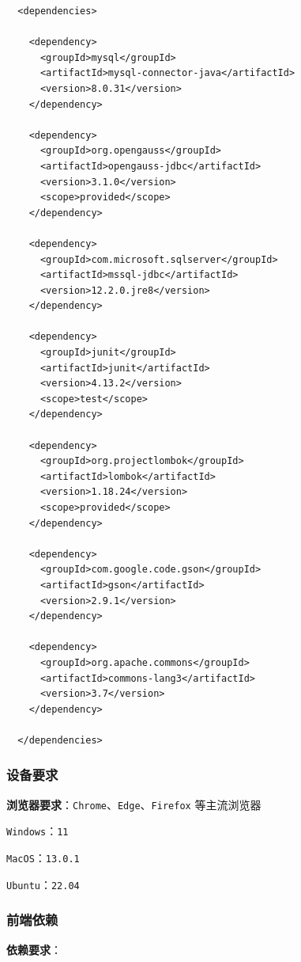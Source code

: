 \documentclass[12pt,a4paper,UTF8]{article}
\begin{document}
\begin{lstlisting}
  <dependencies>

    <dependency>
      <groupId>mysql</groupId>
      <artifactId>mysql-connector-java</artifactId>
      <version>8.0.31</version>
    </dependency>

    <dependency>
      <groupId>org.opengauss</groupId>
      <artifactId>opengauss-jdbc</artifactId>
      <version>3.1.0</version>
      <scope>provided</scope>
    </dependency>

    <dependency>
      <groupId>com.microsoft.sqlserver</groupId>
      <artifactId>mssql-jdbc</artifactId>
      <version>12.2.0.jre8</version>
    </dependency>

    <dependency>
      <groupId>junit</groupId>
      <artifactId>junit</artifactId>
      <version>4.13.2</version>
      <scope>test</scope>
    </dependency>

    <dependency>
      <groupId>org.projectlombok</groupId>
      <artifactId>lombok</artifactId>
      <version>1.18.24</version>
      <scope>provided</scope>
    </dependency>

    <dependency>
      <groupId>com.google.code.gson</groupId>
      <artifactId>gson</artifactId>
      <version>2.9.1</version>
    </dependency>

    <dependency>
      <groupId>org.apache.commons</groupId>
      <artifactId>commons-lang3</artifactId>
      <version>3.7</version>
    </dependency>

  </dependencies>
\end{lstlisting}

\subsubsection{设备要求}

\textbf{浏览器要求}：\verb|Chrome|、\verb|Edge|、\verb|Firefox| 等主流浏览器

\verb|Windows|：\verb|11|

\verb|MacOS|：\verb|13.0.1|

\verb|Ubuntu|：\verb|22.04|

\subsubsection{前端依赖}

\textbf{依赖要求}：

\vspace{0.25cm} %
\end{document}
